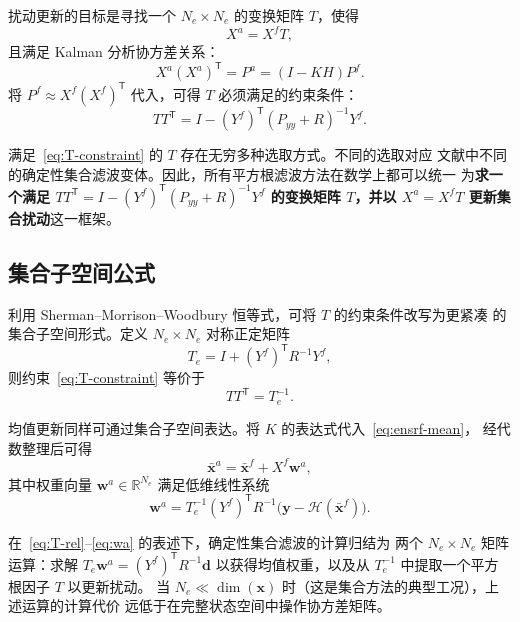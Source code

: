 \documentclass[12pt,a4paper]{article}
\newcommand{\x}{\bm{x}}
\newcommand{\y}{\bm{y}}
\newcommand{\w}{\bm{w}}
\newcommand{\T}{^{\mathsf T}}
\newcommand{\R}{\mathbb{R}}
\newcommand{\calH}{\mathcal{H}}
\begin{document}
扰动更新的目标是寻找一个 $N_e \times N_e$ 的变换矩阵 $T$，使得
\begin{equation}
  X^a = X^f T,
  \label{eq:ensrf-pert}
\end{equation}
且满足 Kalman 分析协方差关系：
\begin{equation}
  X^a (X^a)\T = P^a = (I - KH)P^f.
  \label{eq:ensrf-consistency}
\end{equation}
将 $P^f \approx X^f (X^f)\T$ 代入，可得 $T$ 必须满足的约束条件：
\begin{equation}
  T T\T = I - (Y^f)\T (P_{yy} + R)^{-1} Y^f.
  \label{eq:T-constraint}
\end{equation}

满足~\eqref{eq:T-constraint} 的 $T$ 存在无穷多种选取方式。不同的选取对应
文献中不同的确定性集合滤波变体。因此，所有平方根滤波方法在数学上都可以统一
为\textbf{求一个满足 $T T\T = I - (Y^f)\T(P_{yy}+R)^{-1}Y^f$ 的变换矩阵
$T$，并以 $X^a = X^f T$ 更新集合扰动}这一框架。

\subsection{集合子空间公式}

利用 Sherman--Morrison--Woodbury 恒等式，可将 $T$ 的约束条件改写为更紧凑
的集合子空间形式。定义 $N_e \times N_e$ 对称正定矩阵
\begin{equation}
  T_e = I + (Y^f)\T R^{-1} Y^f,
  \label{eq:Te}
\end{equation}
则约束~\eqref{eq:T-constraint} 等价于
\begin{equation}
  T T\T = T_e^{-1}.
  \label{eq:T-rel}
\end{equation}

均值更新同样可通过集合子空间表达。将 $K$ 的表达式代入~\eqref{eq:ensrf-mean}，
经代数整理后可得
\begin{equation}
  \bar{\x}^a = \bar{\x}^f + X^f \w^a,
  \label{eq:mean-weight}
\end{equation}
其中权重向量 $\w^a \in \R^{N_e}$ 满足低维线性系统
\begin{equation}
  \w^a = T_e^{-1} (Y^f)\T R^{-1} \bigl(\y - \calH(\bar{\x}^f)\bigr).
  \label{eq:wa}
\end{equation}

在~\eqref{eq:T-rel}--\eqref{eq:wa} 的表述下，确定性集合滤波的计算归结为
两个 $N_e \times N_e$ 矩阵运算：求解 $T_e \w^a = (Y^f)\T R^{-1}\mathbf{d}$
以获得均值权重，以及从 $T_e^{-1}$ 中提取一个平方根因子 $T$ 以更新扰动。
当 $N_e \ll \dim(\x)$ 时（这是集合方法的典型工况），上述运算的计算代价
远低于在完整状态空间中操作协方差矩阵。
\end{document}
